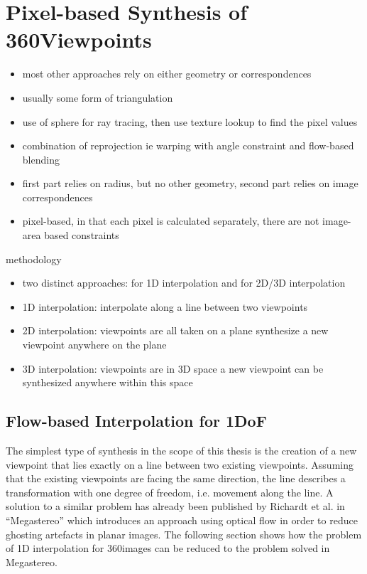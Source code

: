 \chapter{Pixel-based Synthesis of 360\degree Viewpoints}
\begin{itemize}
  \item most other approaches rely on either geometry or correspondences
  \item usually some form of triangulation
  \item use of sphere for ray tracing, then use texture lookup to find the pixel values
  \item combination of reprojection ie warping with angle constraint and flow-based blending
  \item first part relies on radius, but no other geometry, second part relies on image correspondences
  \item pixel-based, in that each pixel is calculated separately, there are not image-area based constraints
\end{itemize}

methodology
\begin{itemize}
\item two distinct approaches: for 1D interpolation and for 2D/3D interpolation
\item 1D interpolation: interpolate along a line between two viewpoints
\item 2D interpolation: viewpoints are all taken on a plane \ar synthesize a new viewpoint anywhere on the plane
\item 3D interpolation: viewpoints are in 3D space \ar a new viewpoint can be synthesized anywhere within this space
\end{itemize}

\section{Flow-based Interpolation for 1DoF}
The simplest type of synthesis in the scope of this thesis is the creation of a new viewpoint that lies exactly on a line between two existing viewpoints. Assuming that the existing viewpoints are facing the same direction, the line describes a transformation with one degree of freedom, i.e. movement along the line. A solution to a similar problem has already been published by Richardt et al. in ``Megastereo'' \cite{megastereo} which introduces an approach using optical flow in order to reduce ghosting artefacts in planar images. The following section shows how the problem of 1D interpolation for 360\degree images can be reduced to the problem solved in Megastereo.

